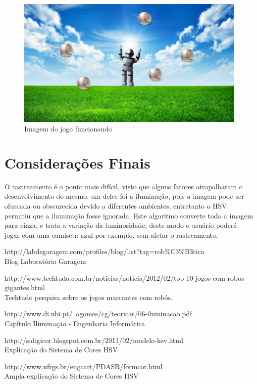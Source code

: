 \documentclass[12pt,openright,oneside,a4paper,brazil]{abntex2}
\begin{document}
\begin{figure}[!htb]
\centering
\includegraphics[scale=0.3]{fundo.jpg}
\caption{Imagem do jogo funcionando}
\end{figure}
\vspace{0.5cm}

\section*{Considerações Finais}

O rastreamento é o ponto mais difícil, visto que alguns fatores atrapalharam o desenvolvimento do mesmo, um deles foi a iluminação, pois a imagem pode ser ofuscada ou obscurecida devido a diferentes ambientes, entretanto o HSV permitiu que a iluminação fosse ignorada. Este algoritmo converte toda a imagem para cinza, e trata a variação da luminosidade, deste modo o usuário poderá jogar com uma camiseta azul por exemplo, sem afetar o rastreamento.


\begin{thebibliography}{6}

\bibitem *http://labdegaragem.com/profiles/blog/list?tag=rob\%C3\%B3tica \\
\newblock Blog Laboratório Garagem

\bibitem *http://www.techtudo.com.br/noticias/noticia/2012/02/top-10-jogos-com-robos-gigantes.html \\
\newblock Techtudo pesquisa sobre os jogos marcantes com robôs.

\bibitem *http://www.di.ubi.pt/~agomes/cg/teoricas/06-iluminacao.pdf \\
\newblock Capítulo Iluminação - Engenharia Informática

\bibitem *http://sidigicor.blogspot.com.br/2011/02/modelo-hsv.html \\
\newblok Explicação do Sistema de Cores HSV

\bibitem *http://www.ufrgs.br/engcart/PDASR/formcor.html \\
\newblock Ampla explicação do Sistema de Cores HSV

\end{thebibliography}
\end{document}
